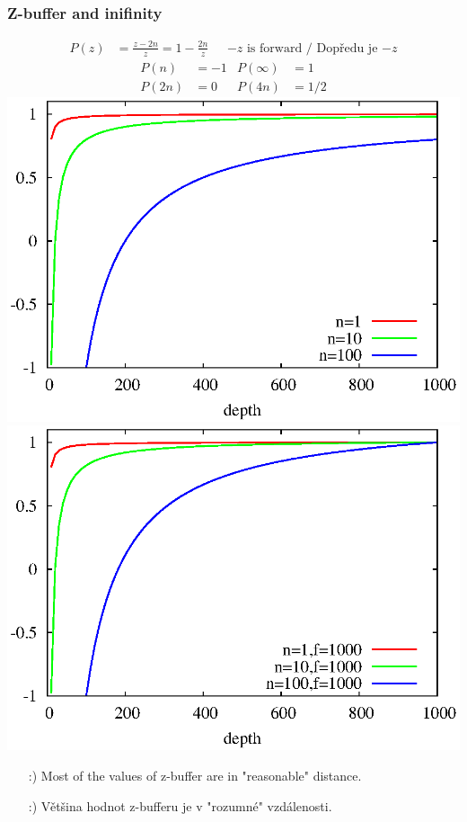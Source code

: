 \begin{frame}\frametitle{Z-buffer and inifinity}
\begin{align*}
  P(z) &= \frac{z - 2n}{z} = 1 - \frac{2n}{z} & \text{ $-z$ is forward / Dopředu je $-z$}
\end{align*}
\pause\vfill
\begin{align*}
  P(n) &= -1 & P(\infty) &=  1 \\
  P(2n) &= 0 & P(4n) &= 1/2
\end{align*}
\includegraphics[width=.25\textwidth]{pics/shadows/shadowVolumes/plot/infdepth.eps}
\includegraphics[width=.25\textwidth]{pics/shadows/shadowVolumes/plot/findepth.eps}
\begin{itemize}
  \item[:)] Most of the values of z-buffer are in "reasonable" distance.
  \item[:)] Většina hodnot z-bufferu je v "rozumné" vzdálenosti.
\end{itemize}
\end{frame}

